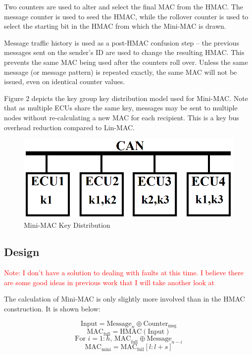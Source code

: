 Two counters are used to alter and select the final MAC from the HMAC. The message counter is used to seed the HMAC, while the rollover counter is used to select the starting bit in the HMAC from which the Mini-MAC is drawn.

Message traffic history is used as a post-HMAC confusion step -- the previous messages sent on the sender's ID are used to change the resulting HMAC. This prevents the same MAC being used after the counters roll over. Unless the same message (or message pattern) is repeated exactly, the same MAC will not be issued, even on identical counter values.

Figure 2 depicts the key group key distribution model used for Mini-MAC. Note that as multiple ECUs share the same key, messages may be sent to multiple nodes without re-calculating a new MAC for each recipient. This is a key bus overhead reduction compared to Lin-MAC.
	
	\begin{figure}
		\centering
		\includegraphics[width=\columnwidth]{figures/key_distribution.png}
		\caption{Mini-MAC Key Distribution}
	\end{figure}
	
	
\subsection{Design}
\textcolor{red}{Note: I don't have a solution to dealing with faults at this time. I believe there are some good ideas in previous work that I will take another look at}

The calculation of Mini-MAC is only slightly more involved than in the HMAC construction. It is shown below:

$$ \text{Input} = \text{Message}_n\oplus\text{Counter}_{\text{msg}} $$
$$ \text{MAC}_{\text{full}} = \text{HMAC}(\text{Input}) $$
$$ \text{For }i=1:h \text{, MAC}_{\text{full}}\oplus\text{Message}_{n-i} $$
$$ \text{MAC}_{\text{mini}} = \text{MAC}_{\text{full}}[l:l+s] $$


